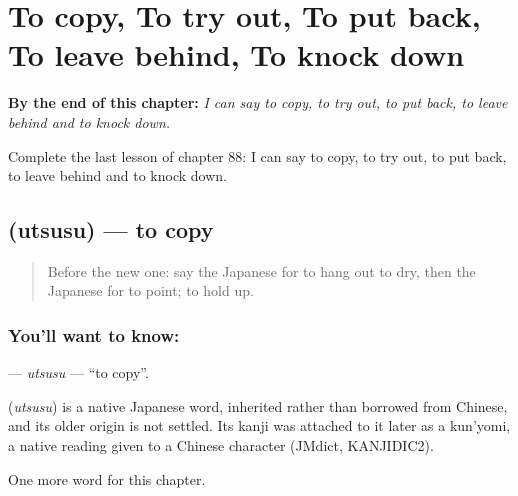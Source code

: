 
\chapter{To copy, To try out, To put back, To leave behind, To knock down}
\label{ch:ja-to-copy-to-try-out-to-put-back-to-leave-behind-to-knock-down}

\begin{chapteropening}
\textbf{By the end of this chapter:} \emph{I can say to copy, to try out, to put back, to leave behind and to knock down.}

Complete the last lesson of chapter 88: I can say to copy, to try out, to put back, to leave behind and to knock down.
\end{chapteropening}

\section[\texorpdfstring{\ja{うつす} (utsusu)}{うつす (utsusu)}]{ (utsusu) — to copy}

\label{lesson:JA-C88-utsusu}



\begin{quote}
Before the new one: say the Japanese for to hang out to dry, then the Japanese for to point; to hold up.
\end{quote}

\subsection*{You'll want to know: }
\textbf{} — \emph{utsusu} — \textquotedblleft{}to copy\textquotedblright{}.

\begin{cousinweb}
\textbf{} (\emph{utsusu}) is a native Japanese word, inherited rather than borrowed from Chinese, and its older origin is not settled. Its kanji was attached to it later as a kun'yomi, a native reading given to a Chinese character (JMdict, KANJIDIC2).
\end{cousinweb}

\begin{grammarlens}[title={What you've built}]
One more word for this chapter.
\end{grammarlens}

